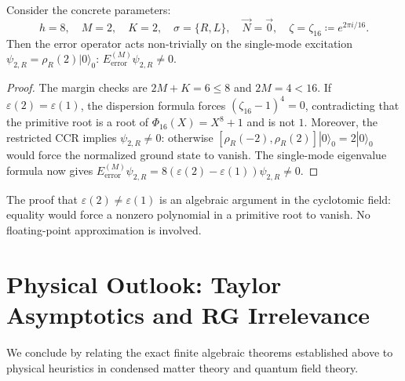 \begin{theorem}
\label{thm:concrete_excited_error_witness}
Consider the concrete parameters:
\begin{equation}
h = 8, \quad M = 2, \quad K = 2, \quad \sigma = \{R,L\}, \quad \vec{N} = \vec{0}, \quad \zeta = \zeta_{16} \coloneqq e^{2\pi i / 16}.
\end{equation}
Then the error operator acts non-trivially on the single-mode excitation
$\psi_{2,R}=\rho_R(2)|0\rangle_0$:
$E_{\mathrm{error}}^{(M)}\psi_{2,R}\ne0$.
\end{theorem}

\begin{proof}
The margin checks are $2M+K=6\le8$ and $2M=4<16$. If $\varepsilon(2)=\varepsilon(1)$, the dispersion formula forces $(\zeta_{16}-1)^4=0$, contradicting that the primitive root is a root of $\Phi_{16}(X)=X^8+1$ and is not $1$. Moreover, the restricted CCR implies $\psi_{2,R}\ne0$: otherwise $[\rho_R(-2),\rho_R(2)]|0\rangle_0=2|0\rangle_0$ would force the normalized ground state to vanish. The single-mode eigenvalue formula now gives $E_{\mathrm{error}}^{(M)}\psi_{2,R}=8(\varepsilon(2)-\varepsilon(1))\psi_{2,R}\ne0$.
\end{proof}

\begin{remark}
The proof that $\varepsilon(2)\ne\varepsilon(1)$ is an algebraic argument in the cyclotomic field: equality would force a nonzero polynomial in a primitive root to vanish. No floating-point approximation is involved.
\end{remark}

\section{Physical Outlook: Taylor Asymptotics and RG Irrelevance}

We conclude by relating the exact finite algebraic theorems established above to physical heuristics in condensed matter theory and quantum field theory.

